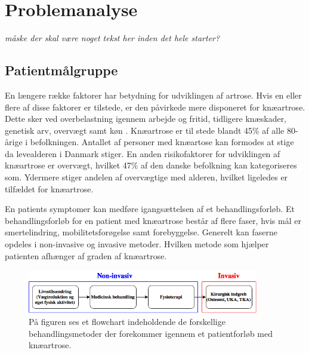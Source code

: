 \section{Problemanalyse}
\textit{måske der skal være noget tekst her inden det hele starter?} \\

\subsection{Patientmålgruppe}

En længere række faktorer har betydning for udviklingen af artrose. Hvis en eller flere af disse faktorer er tilstede, er den påvirkede mere disponeret for knæartrose. Dette sker ved overbelastning igennem arbejde og fritid, tidligere knæskader, genetisk arv, overvægt samt køn \citep{brostrom2012}. Knæartrose er til stede blandt 45\% af alle 80-årige i befolkningen. Antallet af personer med knæartose kan formodes at stige da levealderen i Danmark stiger. %
En anden risikofaktorer for udviklingen af knæartrose er overvægt, hvilket 47\% af den danske befolkning kan kategoriseres som. Ydermere stiger andelen af overvægtige med alderen, hvilket ligeledes er tilfældet for knæartrose. \citep{Vestergaard2014} \citep{Vestergaard2016} \citep{Lind2016} \citep{Lind2016b} 

En patients symptomer kan medføre igangsættelsen af et behandlingsforløb. Et behandlingsforløb for en patient med knæartrose består af flere faser, hvis mål er smertelindring, mobilitetsforøgelse samt forebyggelse. Generelt kan faserne opdeles i non-invasive og invasive metoder. Hvilken metode som hjælper patienten afhænger af graden af knæartrose.

\begin{figure}[H]
	\centering
	\includegraphics[width=0.9\textwidth]{../figures/bProblemanalyse/flowchart_behandlingsforloeb.png}
	\caption{På figuren ses et flowchart indeholdende de forskellige behandlingsmetoder der forekommer igennem et patientforløb med knæartrose.}
	\label{fig:flow_behandlingsfaser}
\end{figure}\vspace{-.25cm}

